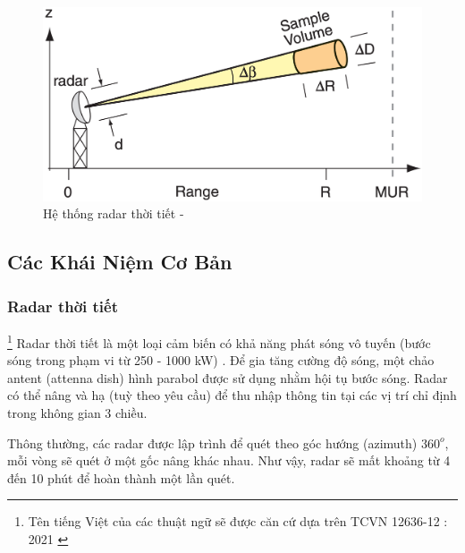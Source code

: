 

\vspace{2cm}
\begin{figure}[H]
    \centering
    \includegraphics[width=1\linewidth]{Images/radar_concept.png}
    \vspace{1em}
    \caption{Hệ thống radar thời tiết - \cite{2022Weather}}
    \label{fig:radar}
\end{figure}
\newpage
\subsection{Các Khái Niệm Cơ Bản}


\subsubsection{Radar thời tiết}
\footnote{Tên tiếng Việt của các thuật ngữ sẽ được căn cứ dựa trên TCVN 12636-12 : 2021 \cite{vn_meteor_standard}}
Radar thời tiết là một loại cảm biến có khả năng phát sóng vô tuyến (bước sóng trong phạm vi từ 250 - 1000 kW) \cite{2022Weather}. Để gia tăng cường độ sóng, một chảo antent (attenna dish) hình parabol được sử dụng nhằm hội tụ bước sóng. Radar có thể nâng và hạ (tuỳ theo yêu cầu) để thu nhập thông tin tại các vị trí chỉ định trong không gian 3 chiều.

Thông thường, các radar được lập trình để quét theo góc hướng (azimuth) $360^o$, mỗi vòng sẽ quét ở một gốc nâng khác nhau. Như vậy, radar sẽ mất khoảng từ 4 đến 10 phút để hoàn thành một lần quét.

